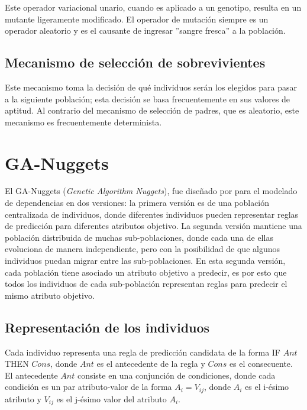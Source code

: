 Este operador variacional unario, cuando es aplicado a un genotipo, resulta en un mutante ligeramente modificado. El operador de mutación siempre es un operador aleatorio y es el causante de ingresar ''sangre fresca'' a la población.

\subsection{Mecanismo de selección de sobrevivientes}

Este mecanismo toma la decisión de qué individuos serán los elegidos para pasar a la siguiente población; esta decisión se basa frecuentemente en sus valores de aptitud. Al contrario del mecanismo de selección de padres, que es aleatorio, este mecanismo es frecuentemente determinista. 

\section{GA-Nuggets}
\label{Ga-Nuggets}

El GA-Nuggets (\textit{Genetic Algorithm Nuggets}), fue diseñado por \cite{book_data_mining} para el modelado de dependencias en dos versiones: la primera versión es de una población centralizada de individuos, donde diferentes individuos pueden representar reglas de predicción para diferentes atributos objetivo. La segunda versión mantiene una población distribuida de muchas sub-poblaciones, donde cada una de ellas evoluciona de manera independiente, pero con la posibilidad de que algunos individuos puedan migrar entre las sub-poblaciones. En esta segunda versión, cada población tiene asociado un atributo objetivo a predecir, es por esto que todos los individuos de cada sub-población representan reglas para predecir el mismo atributo objetivo.

\subsection{Representación de los individuos}

Cada individuo representa una regla de predicción candidata de la forma IF $Ant$ THEN $Cons$, donde $Ant$ es el antecedente de la regla y $Cons$ es el consecuente.
\\

El antecedente $Ant$ consiste en una conjunción de condiciones, donde cada condición es un par atributo-valor de la forma $A_i = V_{ij}$, donde $A_i$ es el i-ésimo atributo y $V_{ij}$ es el j-ésimo valor del atributo $A_i$.
\\


